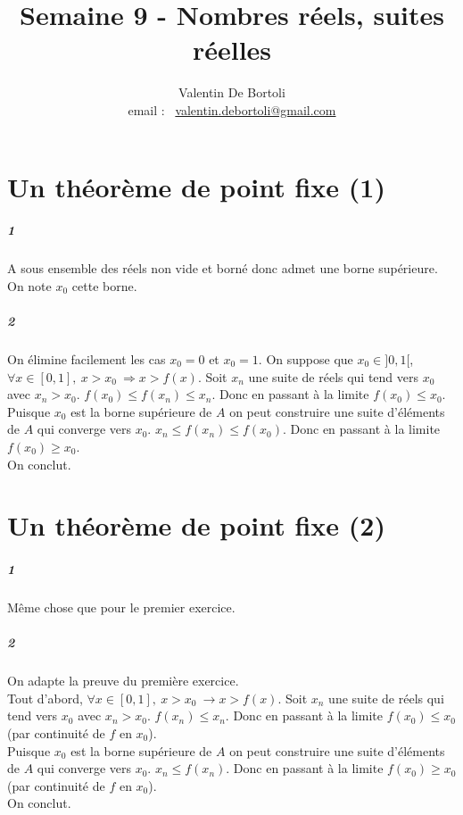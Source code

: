 \documentclass[10pt,a4paper]{article}
\title{Semaine 9 - Nombres réels, suites réelles}
\author{Valentin De Bortoli \\ email : \ \href{mailto:valentin.debortoli@gmail.com}{valentin.debortoli@gmail.com}}
\date{}
\begin{document}
\maketitle
\section{Un théorème de point fixe (1)}
\subparagraph{1}A sous ensemble des réels non vide et borné donc admet une borne supérieure. On note $x_0$ cette borne.
\subparagraph{2}On élimine facilement les cas $x_0=0$ et $x_0=1$. On suppose que $x_0 \in ]0,1[$, $\forall x \in [0,1],\ x>x_0 \ \Rightarrow x>f(x)$. Soit $x_n$ une suite de réels qui tend vers $x_0$ avec $x_n > x_0$. $f(x_0)\le f(x_n) \le x_n$. Donc en passant à la limite $f(x_0)\le x_0$.\\
Puisque $x_0$ est la borne supérieure de $A$ on peut construire une suite d'éléments de $A$ qui converge vers $x_0$. $x_n\le f(x_n) \le f(x_0)$. Donc en passant à la limite $f(x_0) \ge x_0$.\\
On conclut.

\section{Un théorème de point fixe (2)}
\subparagraph{1}Même chose que pour le premier exercice.
\subparagraph{2}On adapte la preuve du première exercice.\\
Tout d'abord, $\forall x \in [0,1],\ x>x_0 \ \rightarrow x>f(x)$. Soit $x_n$ une suite de réels qui tend vers $x_0$ avec $x_n > x_0$. $f(x_n) \le x_n$. Donc en passant à la limite $f(x_0)\le x_0$ (par continuité de $f$ en $x_0$).\\
Puisque $x_0$ est la borne supérieure de $A$ on peut construire une suite d'éléments de $A$ qui converge vers $x_0$. $x_n\le f(x_n)$. Donc en passant à la limite $f(x_0) \ge x_0$ (par continuité de $f$ en $x_0$).\\
On conclut.
\end{document}
